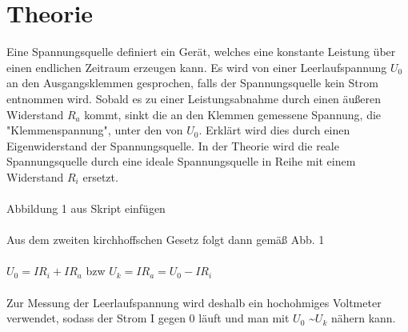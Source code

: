 \section{Theorie}
\label{sec:Theorie}

Eine Spannungsquelle definiert ein Gerät, welches eine konstante Leistung über
einen endlichen Zeitraum erzeugen kann. Es wird von einer Leerlaufspannung $ U_0 $
an den Ausgangsklemmen gesprochen, falls der Spannungsquelle kein Strom entnommen wird.
Sobald es zu einer Leistungsabnahme durch einen äußeren Widerstand $ R_a $ kommt,
sinkt die an den Klemmen gemessene Spannung, die "Klemmenspannung", unter den von $ U_0 $. Erklärt wird
dies durch einen Eigenwiderstand der Spannungsquelle. In der Theorie wird die reale
Spannungsquelle durch eine ideale Spannungsquelle in Reihe mit einem Widerstand $ R_i$
ersetzt.
\\
\\
{\huge Abbildung 1 aus Skript einfügen}
\\
\\
Aus dem zweiten kirchhoffschen Gesetz folgt dann gemäß Abb. 1
\\
\\
$ U_0 = I R_i + I R_a $ bzw $ U_k = I R_a = U_0-IR_i$
\\
\\
Zur Messung der Leerlaufspannung wird deshalb ein hochohmiges Voltmeter verwendet,
sodass der Strom I gegen 0 läuft und man mit $ U_0 $ \textasciitilde $U_k$ nähern kann.

